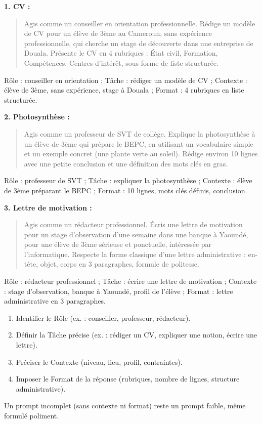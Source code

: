 \documentclass[11pt]{article}
\newcommand{\cle}[1]{{\popxbold\color{popdark}#1}}
\begin{document}
\begin{corrige}
\textbf{1. CV :}
\begin{quote}
\og Agis comme un conseiller en orientation professionnelle. Rédige un modèle de CV pour un élève de 3ème au Cameroun, sans expérience professionnelle, qui cherche un stage de découverte dans une entreprise de Douala. Présente le CV en 4 rubriques : État civil, Formation, Compétences, Centres d'intérêt, sous forme de liste structurée. \fg
\end{quote}
Rôle : conseiller en orientation ; Tâche : rédiger un modèle de CV ; Contexte : élève de 3ème, sans expérience, stage à Douala ; Format : 4 rubriques en liste structurée.

\textbf{2. Photosynthèse :}
\begin{quote}
\og Agis comme un professeur de SVT de collège. Explique la photosynthèse à un élève de 3ème qui prépare le BEPC, en utilisant un vocabulaire simple et un exemple concret (une plante verte au soleil). Rédige environ 10 lignes avec une petite conclusion et une définition des mots clés en gras. \fg
\end{quote}
Rôle : professeur de SVT ; Tâche : expliquer la photosynthèse ; Contexte : élève de 3ème préparant le BEPC ; Format : 10 lignes, mots clés définis, conclusion.

\textbf{3. Lettre de motivation :}
\begin{quote}
\og Agis comme un rédacteur professionnel. Écris une lettre de motivation pour un stage d'observation d'une semaine dans une banque à Yaoundé, pour une élève de 3ème sérieuse et ponctuelle, intéressée par l'informatique. Respecte la forme classique d'une lettre administrative : en-tête, objet, corps en 3 paragraphes, formule de politesse. \fg
\end{quote}
Rôle : rédacteur professionnel ; Tâche : écrire une lettre de motivation ; Contexte : stage d'observation, banque à Yaoundé, profil de l'élève ; Format : lettre administrative en 3 paragraphes.
\end{corrige}

\begin{methode}
\begin{enumerate}
    \item Identifier le \cle{Rôle} (ex. : conseiller, professeur, rédacteur).
    \item Définir la \cle{Tâche} précise (ex. : rédiger un CV, expliquer une notion, écrire une lettre).
    \item Préciser le \cle{Contexte} (niveau, lieu, profil, contraintes).
    \item Imposer le \cle{Format} de la réponse (rubriques, nombre de lignes, structure administrative).
\end{enumerate}
Un prompt incomplet (sans contexte ni format) reste un prompt faible, même formulé poliment.
\end{methode}
\end{document}
